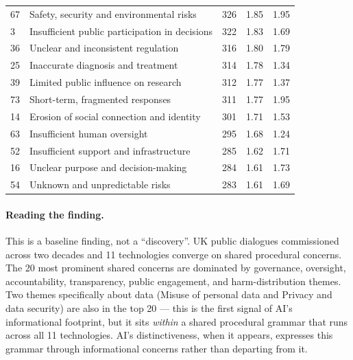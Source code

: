 \documentclass[11pt, a4paper]{article}
\begin{document}
\begin{longtable}{@{}llrrl@{}}
67 & Safety, security and environmental risks     & 326 & 1.85 & 1.95 \\
 3 & Insufficient public participation in decisions & 322 & 1.83 & 1.69 \\
36 & Unclear and inconsistent regulation          & 316 & 1.80 & 1.79 \\
25 & Inaccurate diagnosis and treatment           & 314 & 1.78 & 1.34 \\
39 & Limited public influence on research         & 312 & 1.77 & 1.37 \\
73 & Short-term, fragmented responses             & 311 & 1.77 & 1.95 \\
14 & Erosion of social connection and identity    & 301 & 1.71 & 1.53 \\
63 & Insufficient human oversight                 & 295 & 1.68 & 1.24 \\
52 & Insufficient support and infrastructure      & 285 & 1.62 & 1.71 \\
16 & Unclear purpose and decision-making          & 284 & 1.61 & 1.73 \\
54 & Unknown and unpredictable risks              & 283 & 1.61 & 1.69 \\
\end{longtable}

\paragraph{Reading the finding.}  This is a baseline finding, not a
``discovery''.  UK public dialogues commissioned across two decades and
11 technologies converge on shared procedural concerns.  The 20 most
prominent shared concerns are dominated by governance, oversight,
accountability, transparency, public engagement, and harm-distribution
themes.  Two themes specifically about data (Misuse of personal data and
Privacy and data security) are also in the top 20 --- this is the first
signal of AI's informational footprint, but it sits \emph{within} a
shared procedural grammar that runs across all 11 technologies.  AI's
distinctiveness, when it appears, expresses this grammar through
informational concerns rather than departing from it.

\end{document}
